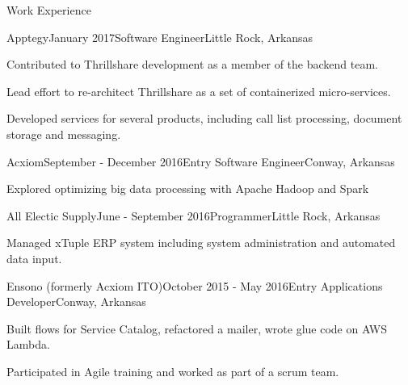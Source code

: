 \documentclass{resume} %
\begin{document}
\begin{rSection}{Work Experience}

\begin{rSubsection}{Apptegy}{January 2017}{Software Engineer}{Little Rock, Arkansas}
	\item Contributed to Thrillshare development as a member of the backend team.
	\item Lead effort to re-architect Thrillshare as a set of containerized micro-services.
	\item Developed services for several products, including call list processing, document storage and messaging.
\end{rSubsection}

\begin{rSubsection}{Acxiom}{September - December 2016}{Entry Software Engineer}{Conway, Arkansas}
	\item Explored optimizing big data processing with Apache Hadoop and Spark
\end{rSubsection}


\begin{rSubsection}{All Electic Supply}{June - September 2016}{Programmer}{Little Rock, Arkansas}
	\item Managed xTuple ERP system including system administration and automated data input.
\end{rSubsection}

\begin{rSubsection}{Ensono (formerly Acxiom ITO)}{October 2015 - May 2016}{Entry Applications Developer}{Conway, Arkansas}
	\item Built flows for Service Catalog, refactored a mailer, wrote glue code on AWS Lambda.
	\item Participated in Agile training and worked as part of a scrum team.
\end{rSubsection}




\end{rSection}
\end{document}

